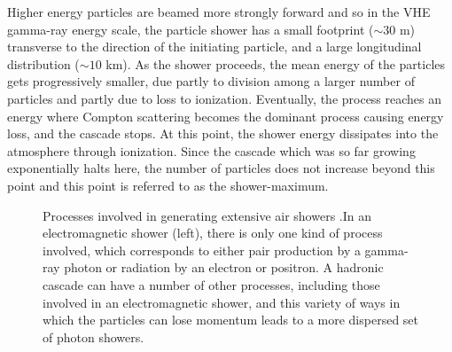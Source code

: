 \documentclass[main.tex]{subfiles}
\begin{document}
Higher energy particles are beamed more strongly forward and so in the VHE gamma-ray energy scale, the particle shower has a small footprint ($\sim 30$ m) transverse to the direction of the initiating particle, and a large longitudinal distribution ($\sim10$ km). As the shower proceeds, the mean energy of the particles gets progressively smaller, due partly to division among a larger number of particles and partly due to loss to ionization. Eventually, the process reaches an energy where Compton scattering becomes the dominant process causing energy loss, and the cascade stops. At this point, the shower energy dissipates into the atmosphere through ionization. Since the cascade which was so far growing exponentially halts here, the number of particles does not increase beyond this point and this point is referred to as the shower-maximum.
\begin{figure}[htbp]
  \centering
  \caption[Processes involved in generating extensive air showers.]{Processes involved in generating extensive air showers \cite{EAS_2018}.In an electromagnetic shower (left), there is only one kind of process involved, which corresponds to either pair production by a gamma-ray photon or radiation by an electron or positron. A hadronic cascade can have a number of other processes, including those involved in an electromagnetic shower, and this variety of ways in which the particles can lose momentum leads to a more dispersed set of photon showers.}
  \label{fig:EAS_img}
\end{figure}
\end{document}
